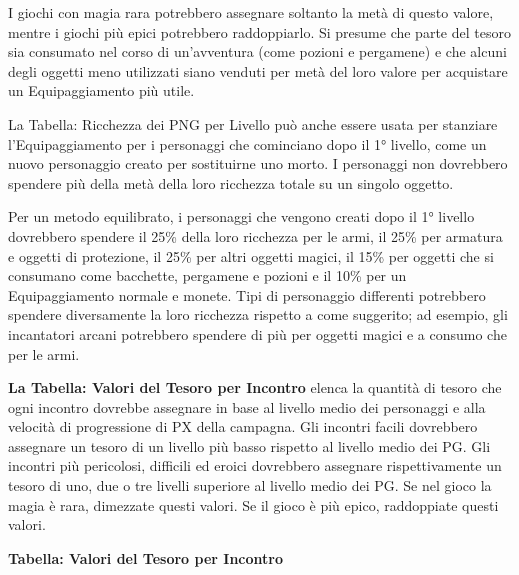 \documentclass[a4paper,11pt,twoside,openany]{book}
\begin{document}
I giochi con magia rara potrebbero assegnare soltanto la metà di questo valore, mentre i giochi più epici potrebbero raddoppiarlo. Si presume che parte del tesoro sia consumato nel corso di un'avventura (come pozioni e pergamene) e che alcuni degli oggetti meno utilizzati siano venduti per metà del loro valore per acquistare un Equipaggiamento più utile.

La Tabella: Ricchezza dei PNG per Livello può anche essere usata per stanziare l'Equipaggiamento per i personaggi che cominciano dopo il 1° livello, come un nuovo personaggio creato per sostituirne uno morto. I personaggi non dovrebbero spendere più della metà della loro ricchezza totale su un singolo oggetto.

Per un metodo equilibrato, i personaggi che vengono creati dopo il 1° livello dovrebbero spendere il 25\% della loro ricchezza per le armi, il 25\% per armatura e oggetti di protezione, il 25\% per altri oggetti magici, il 15\% per oggetti che si consumano come bacchette, pergamene e pozioni e il 10\% per un Equipaggiamento normale e monete. Tipi di personaggio differenti potrebbero spendere diversamente la loro ricchezza rispetto a come suggerito; ad esempio, gli incantatori arcani potrebbero spendere di più per oggetti magici e a consumo che per le armi.

\textbf{La Tabella: Valori del Tesoro per Incontro} elenca la quantità di tesoro che ogni incontro dovrebbe assegnare in base al livello medio dei personaggi e alla velocità di progressione di PX della campagna. Gli incontri facili dovrebbero assegnare un tesoro di un livello più basso rispetto al livello medio dei PG. Gli incontri più pericolosi, difficili ed eroici dovrebbero assegnare rispettivamente un tesoro di uno, due o tre livelli superiore al livello medio dei PG. Se nel gioco la magia è rara, dimezzate questi valori. Se il gioco è più epico, raddoppiate questi valori.

\bigskip

\textbf{Tabella: Valori del Tesoro per Incontro}
\end{document}
